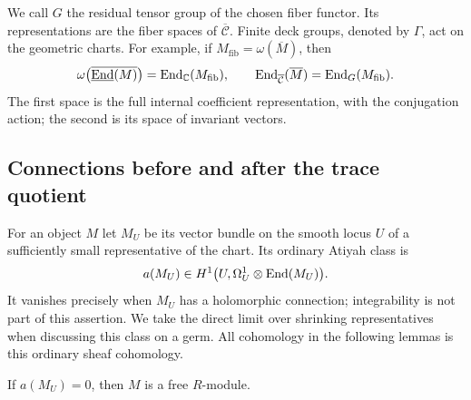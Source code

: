 We call $G$ the residual tensor group of the chosen fiber functor.
Its representations are the fiber spaces of $\overline{\mathcal C}$.
Finite deck groups, denoted by $\Gamma$, act on the geometric charts.
For example, if $M_{\mathrm{fib}}=\omega(\overline M)$, then
\[
 \omega\bigl(\overline{\underline{\operatorname{End}}(M)}\bigr)
       =\operatorname{End}_{\mathbb C}(M_{\mathrm{fib}}),\qquad
 \operatorname{End}_{\overline{\mathcal C}}(\overline M)
       =\operatorname{End}_G(M_{\mathrm{fib}}).
\]
The first space is the full internal coefficient representation, with
the conjugation action; the second is its space of invariant vectors.

\subsection{Connections before and after the trace quotient}

For an object $M$ let $M_U$ be its vector bundle on the smooth locus
$U$ of a sufficiently small representative of the chart.  Its
ordinary Atiyah class \cite{Atiyah1957} is
\[
 a(M_U)\in H^1\bigl(U,\Omega_U^1\otimes\operatorname{End}(M_U)\bigr).
\]
It vanishes precisely when $M_U$ has a holomorphic connection;
integrability is not part of this assertion.  We take the direct
limit over shrinking representatives when discussing this class on
a germ.  All cohomology in the following lemmas is this ordinary
sheaf cohomology.

\begin{lemma}
\label{loc:connection-free}
If $a(M_U)=0$, then $M$ is a free $R$-module.
\end{lemma}

